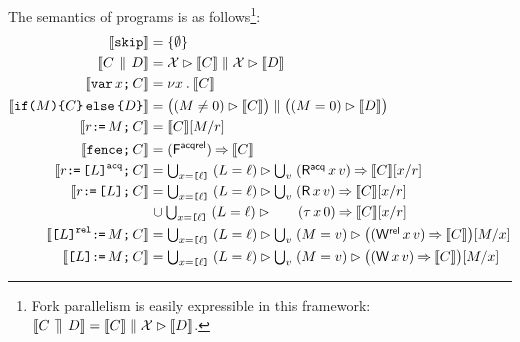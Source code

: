 The semantics of programs is as follows\footnote{Fork parallelism is easily expressible in this
  framework:
  $\llbracket C \,\mathbin{\rrceil}\, D\rrbracket = \llbracket C\rrbracket \parallel \mathcal{X} \mathbin\rhd
  \llbracket D\rrbracket$.}:
\allowdisplaybreaks
\begin{align*}
  \sem{\SKIP} & =
  \{ \emptyset \}
  \\
  \sem{\aCmd \PAR \bCmd} & =
  \Loc \guard \sem{\aCmd} \parallel \Loc \guard \sem{\bCmd} 
  \\
  \sem{\VAR\aLoc\SEMI \aCmd} & =
  \nu \aLoc \st \sem{\aCmd}
  \\
  \sem{\IF{\aExp} \THEN \aCmd \ELSE \bCmd \FI} & =
  \bigl((\aExp \neq 0) \guard \sem{\aCmd}\bigr) \parallel \bigl((\aExp=0) \guard \sem{\bCmd}\bigr) 
  \\
  \sem{\aReg\GETS\aExp\SEMI \aCmd} & =
  \sem{\aCmd}[\aExp/\aReg] 
  \\
  \sem{\FENCE\SEMI \aCmd} & =
  (\DF{}) \prefix \sem{\aCmd}
  \\  
  \sem{\aReg\GETS\REFAcq{\cExp}\SEMI \aCmd} & =
  \textstyle\bigcup_{\aLoc=\REF{\cVal}}\; ({\cExp}=\cVal) \guard \textstyle\bigcup_\aVal\; (\DRAcq\aLoc\aVal) \prefix \sem{\aCmd}[\aLoc/\aReg] 
  \\
  \sem{\aReg\GETS\REF{\cExp}\SEMI \aCmd} & =
  \textstyle\bigcup_{\aLoc=\REF{\cVal}}\; ({\cExp}=\cVal) \guard \textstyle\bigcup_\aVal\; (\DR\aLoc\aVal) \prefix \sem{\aCmd}[\aLoc/\aReg] 
  \\ & \mkern2mu\cup \textstyle\bigcup_{\aLoc=\REF{\cVal}}\; ({\cExp}=\cVal) \guard \mkern18mu\;\mkern10mu (\iDR{\aLoc}{0}) \prefix \sem{\aCmd}[\aLoc/\aReg]
  \\
  \sem{\REFRel{\cExp}\GETS\aExp\SEMI \aCmd} & =
  \textstyle\bigcup_{\aLoc=\REF{\cVal}}\; ({\cExp}=\cVal) \guard \textstyle\bigcup_\aVal\;  (\aExp=\aVal) \guard\bigl((\DWRel\aLoc\aVal) \prefix \sem{\aCmd}\bigr)[\aExp/\aLoc] 
  \\
  \sem{\REF{\cExp}\GETS\aExp\SEMI \aCmd} & =
  \textstyle\bigcup_{\aLoc=\REF{\cVal}}\; ({\cExp}=\cVal) \guard \textstyle\bigcup_\aVal\;  (\aExp=\aVal) \guard\bigl((\DW\aLoc\aVal) \prefix \sem{\aCmd}\bigr)[\aExp/\aLoc]

\end{align*}
